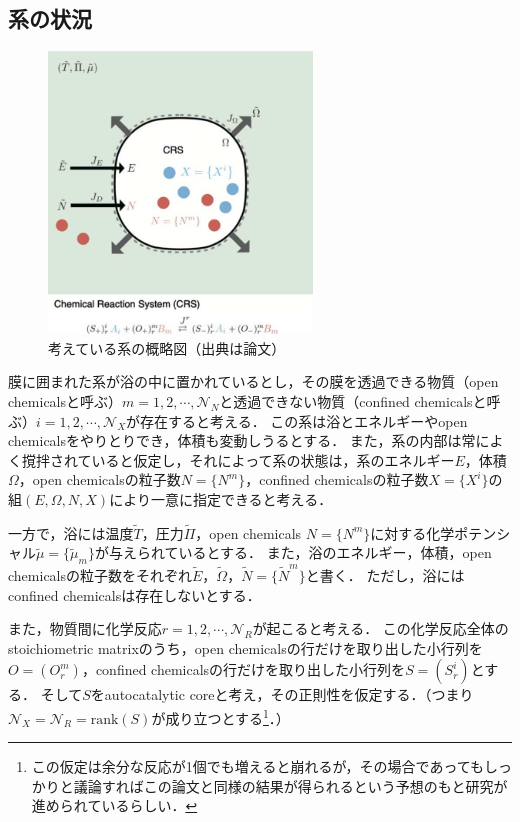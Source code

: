 \documentclass[a4paper,11pt]{jsarticle}
\theoremstyle{definition}
\begin{document}
\subsection{系の状況}

\begin{figure}[htbp]
  \centering
  \includegraphics[width=7cm]{crs.png}
  \caption{考えている系の概略図（出典は論文）}
  \label{fig:crs}
\end{figure}

膜に囲まれた系が浴の中に置かれているとし，その膜を透過できる物質（open chemicalsと呼ぶ）$m=1,2,\cdots,\mathcal{N}_N$と透過できない物質（confined chemicalsと呼ぶ）$i=1,2,\cdots,\mathcal{N}_X$が存在すると考える．
この系は浴とエネルギーやopen chemicalsをやりとりでき，体積も変動しうるとする．
また，系の内部は常によく撹拌されていると仮定し，それによって系の状態は，系のエネルギー$E$，体積$\Omega$，open chemicalsの粒子数$N=\{ N^m \}$，confined chemicalsの粒子数$X = \{ X^i \}$の組$(E,\Omega,N,X)$により一意に指定できると考える．

一方で，浴には温度$\tilde{T}$，圧力$\tilde{\Pi}$，open chemicals $N=\{ N^m \}$に対する化学ポテンシャル$\tilde{\mu} = \{ \tilde{\mu}_m \}$が与えられているとする．
また，浴のエネルギー，体積，open chemicalsの粒子数をそれぞれ$\tilde{E}$，$\tilde{\Omega}$，$\tilde{N} = \{ \tilde{N}^m \}$と書く．
ただし，浴にはconfined chemicalsは存在しないとする．

また，物質間に化学反応$r=1,2,\cdots,\mathcal{N}_R$が起こると考える．
この化学反応全体のstoichiometric matrixのうち，open chemicalsの行だけを取り出した小行列を$O=(O^m_r)$，confined chemicalsの行だけを取り出した小行列を$S=(S^i_r)$とする．
そして$S$をautocatalytic coreと考え，その正則性を仮定する．（つまり$\mathcal{N}_X=\mathcal{N}_R=\mathrm{rank}(S)$が成り立つとする\footnote{この仮定は余分な反応が1個でも増えると崩れるが，その場合であってもしっかりと議論すればこの論文と同様の結果が得られるという予想のもと研究が進められているらしい．}．）
\end{document}
